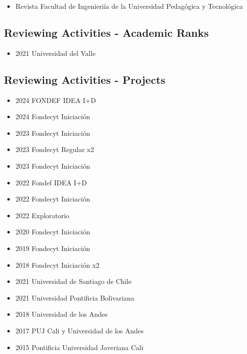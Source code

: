 {\begin{itemize}
\item Revista Facultad de Ingenieri\'ia de la Universidad Pedag\'ogica y Tecnol\'ogica
\end{itemize}
}
\clearpage

\subsection{Reviewing Activities - Academic Ranks}

{\begin{itemize}
\item 2021 Universidad del Valle
\end{itemize}
}

\subsection{Reviewing Activities - Projects}

{\begin{itemize}
\item 2024 FONDEF IDEA I+D
\item 2024 Fondecyt Iniciaci\'on
\item 2023 Fondecyt Iniciaci\'on
\item 2023 Fondecyt Regular x2
\item 2023 Fondecyt Iniciaci\'on
\item 2022 Fondef IDEA I+D
\item 2022 Fondecyt Iniciaci\'on
\item 2022 Exploratorio
\item 2020 Fondecyt Iniciaci\'on
\item 2019 Fondecyt Iniciaci\'on
\item 2018 Fondecyt Iniciaci\'on x2
\end{itemize}
}

{\begin{itemize}
\item 2021 Universidad de Santiago de Chile
\end{itemize}
}

{\begin{itemize}
\item 2021 Universidad Pontificia Bolivariana
\item 2018 Universidad de los Andes
\item 2017 PUJ Cali y Universidad de los Andes
\item 2015 Pontificia Universidad Javeriana Cali
\end{itemize}
}
\clearpage

